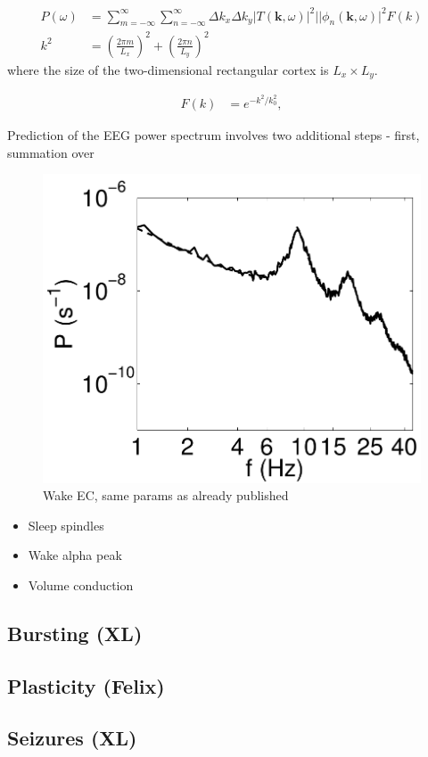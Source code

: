 \documentclass[preprint,review,10pt,authoryear,letterpaper]{elsarticle}
\begin{document}
\begin{align}
\label{eqn:power_sum}
P(\omega) &= \sum_{m = -\infty}^{\infty}\sum_{n = -\infty}^{\infty} \Delta k_x \Delta k_y |T(\mathbf{k},\omega)|^2||\phi_n(\mathbf{k},\omega)|^2F(k)\\
k^2 &=  \left( \frac{2\pi m}{L_x} \right)^2 + \left( \frac{2\pi n}{L_y}\right)^2 
\end{align}
where the size of the two-dimensional rectangular cortex is $L_x \times L_y$. 

\begin{align}
F(k) &= e^{-k^2/k_0^2},
\end{align}


Prediction of the EEG power spectrum involves two additional steps - first, summation over 
\begin{figure}[!b]
\begin{center}
\includegraphics[width=0.40\columnwidth]{corticothalamic_comparison}
\caption{Wake EC, same params as already published}
\label{fig:ct_spectrum_1}
\end{center}
\end{figure}

\begin{itemize}
	\item Sleep spindles
	\item Wake alpha peak
	\item Volume conduction
\end{itemize}

\subsection{Bursting (XL)}
\label{sec:burst}

\subsection{Plasticity (Felix)}
\label{sec:plasticity}

\subsection{Seizures (XL)}
\end{document}
